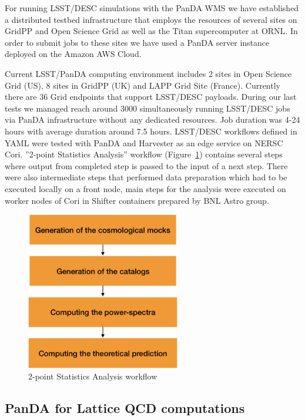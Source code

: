 \documentclass{webofc}
\begin{document}
For running LSST/DESC simulations with the PanDA WMS we have established a distributed testbed infrastructure that employs the resources of several sites on GridPP and Open Science Grid as well as the Titan supercomputer at ORNL. In order to submit jobs to these sites we have used a PanDA server instance deployed on the Amazon AWS Cloud. 

Current LSST/PanDA computing environment includes 2 sites in Open Science Grid (US), 8 sites in GridPP (UK) and LAPP Grid Site (France). Currently there are 36 Grid endpoints that support LSST/DESC payloads. During our last tests we managed reach around 3000 simultaneously running LSST/DESC jobs via PanDA infrastructure without any dedicated resources. Job duration was 4-24 hours with average duration around 7.5 hours.
LSST/DESC workflows defined in YAML were tested with PanDA and Harvester as an edge service on NERSC Cori. ''2-point Statistics Analysis'' workflow (Figure~\ref{fig:lsst_desc_2pt_stats}) contains several steps where output from completed step is passed to the input of a next step. There were also intermediate steps that performed data preparation which had to be executed locally on a front node, main steps for the analysis were executed on worker nodes of Cori in Shifter containers prepared by BNL Astro group.



\begin{figure}
  \centering
  \includegraphics[width=0.60\textwidth]{figures/LSST_2point_statistics.png}
  \caption{2-point Statistics Analysis workflow}
  \label{fig:lsst_desc_2pt_stats}
\end{figure}


\subsection{PanDA for Lattice QCD computations}
\end{document}
